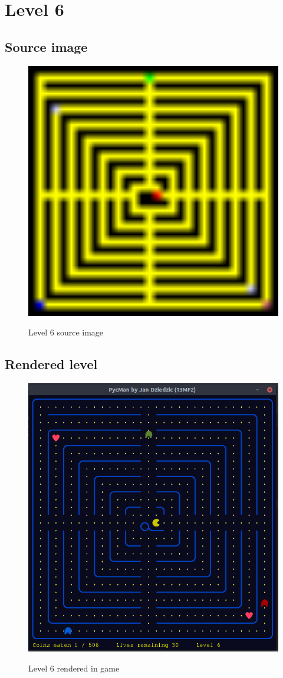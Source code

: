 \documentclass[11pt,a4paper,notitlepage]{report}
\newcommand{\dsubsection}[1]{\FloatBarrier \subsection{#1}}
\newenvironment{img}{
	\begin{center}
		\begin{figure}[H]
			\begin{center}
			
}{
	\end{center}
		\end{figure}
			\end{center}
}
\begin{document}
		\section{Level 6}
			\dsubsection{Source image}
			\begin{img}
				\includegraphics[width=350pt]{images/level6}\\
				\caption{Level 6 source image}
			\end{img}
			\dsubsection{Rendered level}
			\begin{img}
				\includegraphics[width=350pt]{images/level6_r}\\
				\caption{Level 6 rendered in game}
			\end{img}
\end{document}
